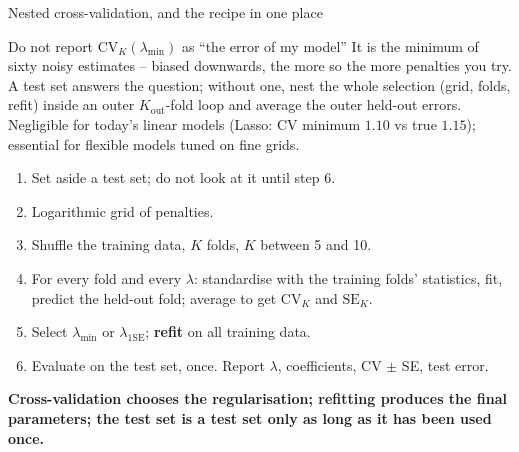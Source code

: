 \documentclass[10pt,aspectratio=169]{beamer}
\begin{document}
\begin{frame}{Nested cross-validation, and the recipe in one place}
\begin{block}{Do not report $\mathrm{CV}_K(\lambda_{\min})$ as ``the error of my model''}
It is the minimum of sixty noisy estimates -- biased downwards, the more so
the more penalties you try.  A test set answers the question; without one,
nest the whole selection (grid, folds, refit) inside an outer $K_{\mathrm{out}}$-fold
loop and average the outer held-out errors.  Negligible for today's linear
models (Lasso: CV minimum $1.10$ vs true $1.15$); essential for flexible
models tuned on fine grids.
\end{block}
\vspace{2pt}
\begin{enumerate}
  \item Set aside a test set; do not look at it until step 6.
  \item Logarithmic grid of penalties.
  \item Shuffle the training data, $K$ folds, $K$ between 5 and 10.
  \item For every fold and every $\lambda$: standardise with the training
        folds' statistics, fit, predict the held-out fold; average to get
        $\mathrm{CV}_K$ and $\mathrm{SE}_K$.
  \item Select $\lambda_{\min}$ or $\lambda_{1\mathrm{SE}}$; \textbf{refit}
        on all training data.
  \item Evaluate on the test set, once.  Report $\lambda$, coefficients,
        CV $\pm$ SE, test error.
\end{enumerate}
\vspace{2pt}
\centering\small
\textbf{Cross-validation chooses the regularisation; refitting produces the
final parameters; the test set is a test set only as long as it has been used
once.}
\end{frame}

\end{document}
